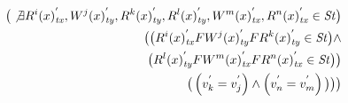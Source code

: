 \documentclass{sig-alternate-05-2015}
\begin{document}
\begin{align}
\begin{split}
    \big( \not\exists {R^i}(x)^{'}_\mathit{tx}, {W^j}(x)^{'}_\mathit{ty}, {R^k}(x)^{'}_\mathit{ty}, {R^l}(x)^{'}_\mathit{ty}, {W^m}(x)^{'}_\mathit{tx}, {R^n}(x)^{'}_\mathit{tx} \in \mathit{St} \big)  \\
     \big( \big( {R^i}(x)^{'}_\mathit{tx} F {W^j}(x)^{'}_\mathit{ty} F {R^k}(x)^{'}_\mathit{ty} \in \mathit{St} \big) \wedge \\
  \big(  {R^l}(x)^{'}_\mathit{ty} F {W^m}(x)^{'}_\mathit{tx} F {R^n}(x)^{'}_\mathit{tx} \in \mathit{St} \big)  \big)  \\
  \big(  \left( v_k^{'} = v_j^{'} \right) \wedge
 \left( v_n^{'} = v_m^{'} \right) \big) \big) \big)
\end{split}
  \end{align}
\end{document}
